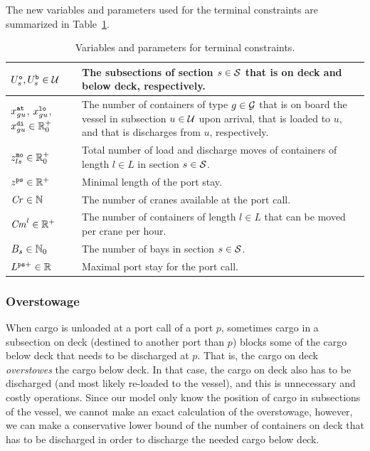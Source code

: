 The new variables and parameters used for the terminal constraints are summarized in Table~\ref{tab:portStay}. %

\begin{table}
\centering
\btsize
\begin{tabular}{lp{10cm}}
${U}^\texttt{o}_s, {U}^\texttt{b}_s \in \mathcal{U}$	%
																	& %
																	The subsections of section $s\in \mathcal{S}$ that is on deck and below deck, respectively.\\
\hline 
$x^\texttt{at}_{gu}$, $x^\texttt{lo}_{gu}$, $x^\texttt{di}_{gu}\in\mathbb{R}^+_0$
																	& The number of containers of type $g\in \mathcal{G}$ that is on board the vessel in subsection $u\in\mathcal{U}$ upon arrival, that is loaded to $u$, and that is discharges from $u$, respectively.\\
$z^\texttt{mo}_{ls}\in\mathbb{R}^+_0$& Total number of load and discharge moves of containers of length $l\in L$ in section $s\in\mathcal{S}$.\\					
$z^{\texttt{ps}}\in\mathbb{R}^+$ 		& Minimal length of the port stay.\\
\hline
$\mathit{Cr}\in\mathbb{N}$								& The number of cranes available at the port call.\\
$\mathit{Cm}^{l}\in\mathbb{R}^+$					& The number of containers of length $l\in L$ that can be moved per crane per hour.\\
$B_{s}\in \mathbb{N}_0$								& The number of bays in section $s\in \mathcal{S}$.\\
$L^{\texttt{ps}+}\in\mathbb{R}$					& Maximal port stay for the port call.\\
\end{tabular}
\etsize
\caption{Variables and parameters for terminal constraints.}\label{tab:portStay}
\end{table}

\subsubsection{Overstowage}
When cargo is unloaded at a port call of a port $p$, sometimes cargo in a subsection on deck (destined to another port than $p$) blocks some of the cargo below deck that needs to be discharged at $p$. That is, the cargo on deck \emph{overstowes} the cargo below deck. In that case, the cargo on deck also has to be discharged (and most likely re-loaded to the vessel), and this is unnecessary and costly operations. 
Since our model only know the position of cargo in subsections of the vessel, we cannot make an exact calculation of the overstowage, however, we can make a conservative lower bound of the number of containers on deck that has to be discharged in order to discharge the needed cargo below deck. 

